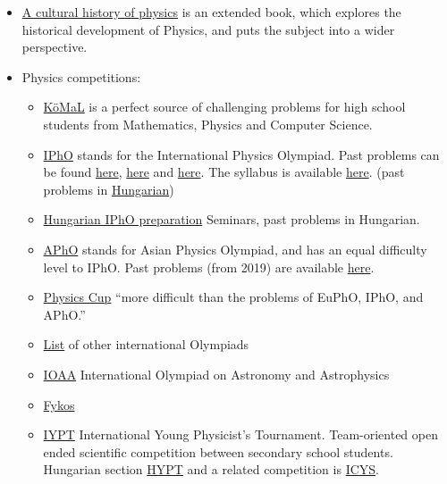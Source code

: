 \documentclass{article}
\begin{document}
\begin{itemize}
\item \href{https://www.goodreads.com/book/show/13335561-a-cultural-history-of-physics}{A cultural history of physics} is an extended book, which explores the historical development of Physics, and puts the subject into a wider perspective.

\item Physics competitions:
\begin{itemize}
\item \href{https://www.komal.hu/home.e.shtml}{KöMaL} is a perfect source of challenging problems for high school students from Mathematics, Physics and Computer Science.

\item \href{https://ipho-unofficial.org/}{IPhO} stands for the International Physics Olympiad. Past problems can be found \href{https://physprob.com/}{here}, \href{https://fks.sk/~bzduso/physics/ipho/}{here} and \href{https://omega4edu.org/physics.html}{here}. The syllabus is available \href{https://www.ipho-new.org/statutes-syllabus/}{here}. (past problems in \href{http://ipho.elte.hu/iphos.php}{Hungarian})

\item \href{http://ipho.elte.hu/}{Hungarian IPhO preparation} Seminars, past problems in Hungarian.

\item \href{http://asianphysicsolympiad.org/}{APhO} stands for Asian Physics Olympiad, and has an equal difficulty level to IPhO. Past problems (from 2019) are available \href{https://apho2019.asi.edu.au/resources/past-questions/}{here}.

\item \href{https://physicscup.ee/}{Physics Cup} ``more difficult than the problems of EuPhO, IPhO, and APhO.''

\item \href{http://eik.bme.hu/~vanko/fizika/olimpia.htm}{List} of other international Olympiads

\item \href{http://www.ioaastrophysics.org/}{IOAA} International Olympiad on Astronomy and Astrophysics

\item \href{https://fykos.org/en}{Fykos}


\item \href{https://www.iypt.org/}{IYPT} International Young Physicist's Tournament. Team-oriented open ended scientific competition between secondary school students. Hungarian section \href{http://hypt.elte.hu/}{HYPT} and a related competition is \href{http://metal.elte.hu/~icys/}{ICYS}.


\end{itemize}
\end{itemize}
\end{document}
